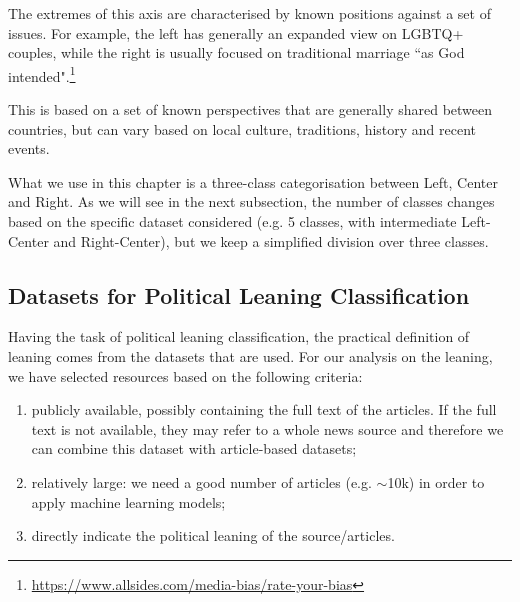 The extremes of this axis are characterised by known positions against a set of issues. For example, the left has generally an expanded view on LGBTQ+ couples, while the right is usually focused on traditional marriage ``as God intended".\footnote{\url{https://www.allsides.com/media-bias/rate-your-bias}}


This is based on a set of known perspectives that are generally shared between countries, but can vary based on local culture, traditions, history and recent events.

What we use in this chapter is a three-class categorisation between Left, Center and Right. As we will see in the next subsection, the number of classes changes based on the specific dataset considered (e.g. 5 classes, with intermediate Left-Center and Right-Center), but we keep a simplified division over three classes.


\subsection{\statusgreen Datasets for Political Leaning Classification}
\label{ssec:ps_leaning_data}

Having the task of political leaning classification, the practical definition of leaning comes from the datasets that are used.
For our analysis on the leaning, we have selected resources based on the following criteria:

\begin{enumerate}
    \item publicly available, possibly containing the full text of the articles. If the full text is not available, they may refer to a whole news source and therefore we can combine this dataset with article-based datasets;
    \item relatively large: we need a good number of articles (e.g. $\sim$10k) in order to apply machine learning models;
    \item directly indicate the political leaning of the source/articles.
\end{enumerate}

